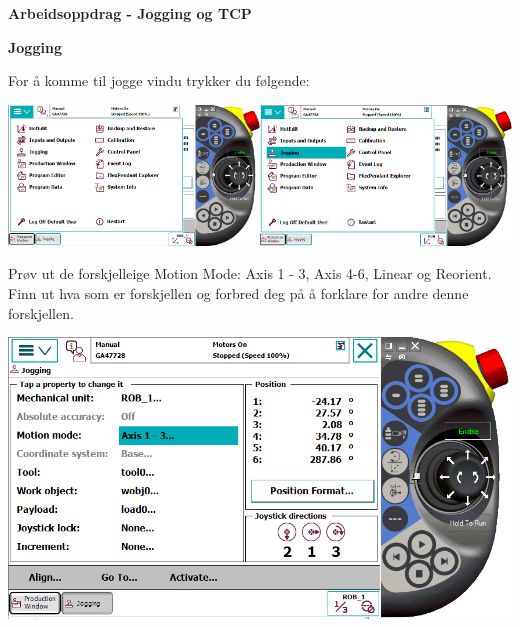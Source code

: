 \vskip 5pt 
\textbf{Arbeidsoppdrag - Jogging og TCP}

\textbf{Jogging}

\vspace{1cm}

For å komme til jogge vindu trykker du følgende:

\vspace{1cm}

\includegraphics[width=0.5\textwidth]{i04861x01}\includegraphics[width=0.5\textwidth]{i04861x02}

\vspace{1cm}

Prøv ut de forskjelleige Motion Mode: Axis 1 - 3, Axis 4-6, Linear og Reorient. Finn ut hva som er forskjellen og forbred deg på å forklare for andre denne forskjellen. 

\vspace{1cm}

\includegraphics[width=1\textwidth]{i04861x03}

\vspace{1cm}

